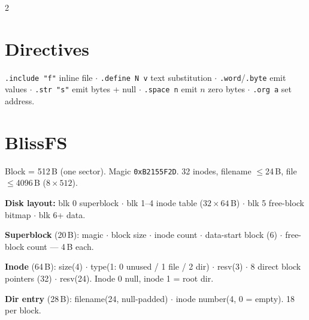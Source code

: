 \documentclass[9pt]{extarticle}
\newcommand{\code}[1]{\texttt{#1}}
\begin{document}
\begin{multicols}{2}
\section{Directives}
\code{.include "f"} inline file $\cdot$ \code{.define N v} text substitution
$\cdot$ \code{.word}/\code{.byte} emit values $\cdot$ \code{.str "s"} emit
bytes + null $\cdot$ \code{.space n} emit $n$ zero bytes $\cdot$ \code{.org a}
set address.

\section{BlissFS}
Block = 512\,B (one sector). Magic \code{0xB2155F2D}. 32 inodes, filename
$\le$24\,B, file $\le$4096\,B ($8\times512$).

\vspace{0.25em}
\textbf{Disk layout:} blk 0 superblock $\cdot$ blk 1--4 inode table
($32\times64$\,B) $\cdot$ blk 5 free-block bitmap $\cdot$ blk 6+ data.

\vspace{0.2em}
\textbf{Superblock} (20\,B): magic $\cdot$ block size $\cdot$ inode count
$\cdot$ data-start block (6) $\cdot$ free-block count --- 4\,B each.

\vspace{0.2em}
\textbf{Inode} (64\,B): size(4) $\cdot$ type(1: 0 unused / 1 file / 2 dir)
$\cdot$ resv(3) $\cdot$ 8 direct block pointers (32) $\cdot$ resv(24).
Inode 0 null, inode 1 = root dir.

\vspace{0.2em}
\textbf{Dir entry} (28\,B): filename(24, null-padded) $\cdot$ inode number(4,
0 = empty). 18 per block.

\end{multicols}
\end{document}
